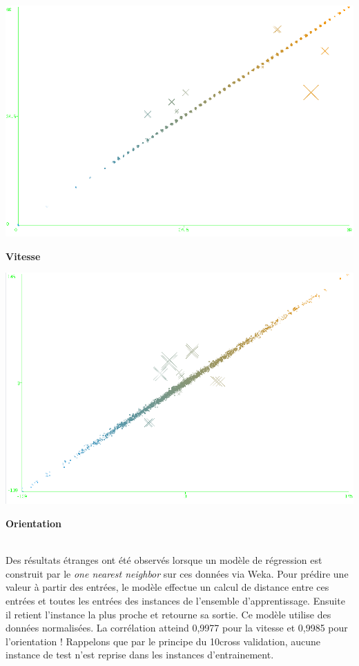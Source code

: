 \begin{minipage}[c]{\mpwekawidth}
 \includegraphics[width=\textwidth]{../figures/1BkSpeed.png}
 \begin{center}
  \textbf{Vitesse}
 \end{center}
\end{minipage}
\begin{minipage}[c]{\mpwekawidth}
 \includegraphics[width=\textwidth]{../figures/IB1.png}
 \begin{center}
  \textbf{Orientation}
 \end{center}
\end{minipage}
\\

Des résultats étranges ont été observés lorsque un modèle de régression est construit par le \emph{one nearest neighbor} sur ces données via Weka.
Pour prédire une valeur à partir des entrées, le modèle effectue un calcul de distance entre ces entrées et toutes les entrées des instances de l'ensemble d'apprentissage.
Ensuite il retient l'instance la plus proche et retourne sa sortie.
Ce modèle utilise des données normalisées.
La corrélation atteind 0,9977 pour la vitesse et 0,9985 pour l'orientation !
Rappelons que par le principe du 10cross validation, aucune instance de test n'est reprise dans les instances d'entrainement.

